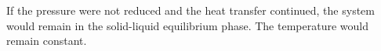 If the pressure were not reduced and the heat transfer continued, the system would remain in the solid-liquid equilibrium phase. The temperature would remain constant.
